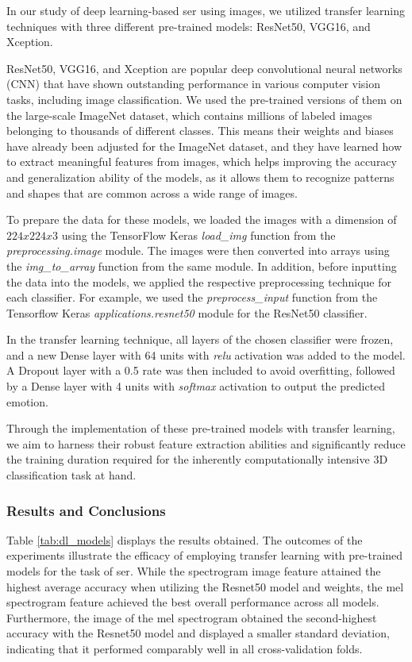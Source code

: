 In our study of deep learning-based \ac{ser} using images, we utilized transfer learning techniques with three different pre-trained models: ResNet50, VGG16, and Xception.

ResNet50, VGG16, and Xception are popular deep convolutional neural networks (CNN) that have shown outstanding performance in various computer vision tasks, including image classification. We used the pre-trained versions of them on the large-scale ImageNet dataset, which contains millions of labeled images belonging to thousands of different classes. This means their weights and biases have already been adjusted for the ImageNet dataset, and they have learned how to extract meaningful features from images, which helps improving the accuracy and generalization ability of the models, as it allows them to recognize patterns and shapes that are common across a wide range of images.

To prepare the data for these models, we loaded the images with a dimension of $224x224x3$ using the TensorFlow Keras \textit{load\_img} function from the \textit{preprocessing.image} module. The images were then converted into arrays using the \textit{img\_to\_array} function from the same module. In addition, before inputting the data into the models, we applied the respective preprocessing technique for each classifier. For example, we used the \textit{preprocess\_input} function from the Tensorflow  Keras \textit{applications.resnet50} module for the ResNet50 classifier.

In the transfer learning technique, all layers of the chosen classifier were frozen, and a new Dense layer with 64 units with \textit{relu} activation was added to the model. A Dropout layer with a 0.5 rate was then included to avoid overfitting, followed by a Dense layer with 4 units with \textit{softmax} activation to output the predicted emotion.

Through the implementation of these pre-trained models with transfer learning, we aim to harness their robust feature extraction abilities and significantly reduce the training duration required for the inherently computationally intensive 3D classification task at hand.


\subsubsection{Results and Conclusions}

Table \ref{tab:dl_models} displays the results obtained. The outcomes of the experiments illustrate the efficacy of employing transfer learning with pre-trained models for the task of \ac{ser}. While the spectrogram image feature attained the highest average accuracy when utilizing the Resnet50 model and weights, the mel spectrogram feature achieved the best overall performance across all models. Furthermore, the image of the mel spectrogram obtained the second-highest accuracy with the Resnet50 model and displayed a smaller standard deviation, indicating that it performed comparably well in all cross-validation folds.

